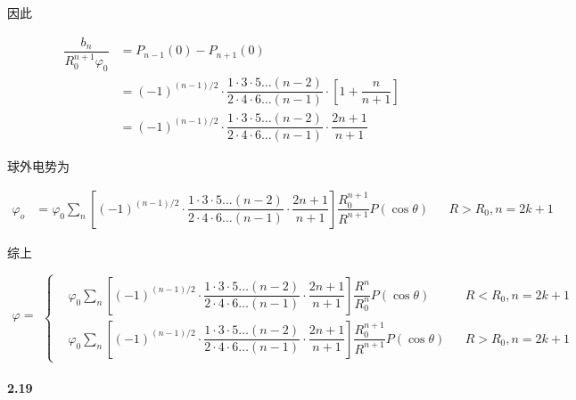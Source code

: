 \documentclass{article}
\begin{document}
因此

\begin{equation*}
  \begin{aligned}
    \dfrac{b_n}{R_0^{n+1} \varphi_0}  &=
    P_{n-1} \left( 0 \right) - P_{n+1} \left( 0 \right) \\
    &= \left( -1  \right)^{\left( n-1 \right)/ 2} \cdot \dfrac{1 \cdot 3 \cdot 5 \dots \left( n-2 \right)}{2 \cdot 4 \cdot 6 \dots \left( n-1 \right)} \cdot \left[ 1 + \dfrac{n}{n+1}  \right] \\
    &= \left( -1  \right)^{\left( n-1 \right)/ 2} \cdot \dfrac{1 \cdot 3 \cdot 5 \dots \left( n-2 \right)}{2 \cdot 4 \cdot 6 \dots \left( n-1 \right)} \cdot \dfrac{2n+1}{n+1}
  \end{aligned}
\end{equation*}

球外电势为

\begin{equation*}
  \begin{aligned}
    \varphi_o &= \varphi_0 \sum_n \left[ \left( -1  \right)^{\left( n-1 \right)/ 2} \cdot \dfrac{1 \cdot 3 \cdot 5 \dots \left( n-2 \right)}{2 \cdot 4 \cdot 6 \dots \left( n-1 \right)} \cdot \dfrac{2n+1}{n+1}
 \right] \dfrac{R_0^{n+1}}{R^{n+1}}  P \left( \cos \theta \right) && R>R_0, n=2k+1
  \end{aligned}
\end{equation*}

综上

\begin{equation*}
  \begin{aligned}
    \varphi = 
  \end{aligned}
  \left\{
  \begin{aligned}
    &\varphi_0 \sum_n \left[ \left( -1  \right)^{\left( n-1 \right)/ 2} \cdot \dfrac{1 \cdot 3 \cdot 5 \dots \left( n-2 \right)}{2 \cdot 4 \cdot 6 \dots \left( n-1 \right)} \cdot \dfrac{2n+1}{n+1}
 \right] \dfrac{R^n}{R_0^n}  P \left( \cos \theta \right) && R<R_0, n=2k+1 \\
    &\varphi_0 \sum_n \left[ \left( -1  \right)^{\left( n-1 \right)/ 2} \cdot \dfrac{1 \cdot 3 \cdot 5 \dots \left( n-2 \right)}{2 \cdot 4 \cdot 6 \dots \left( n-1 \right)} \cdot \dfrac{2n+1}{n+1}
 \right] \dfrac{R_0^{n+1}}{R^{n+1}}  P \left( \cos \theta \right) && R>R_0, n=2k+1
  \end{aligned}
  \right.
\end{equation*}

\paragraph{2.19}
\end{document}
